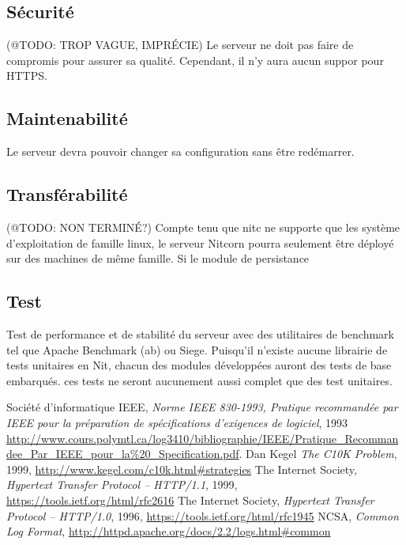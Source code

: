 \documentclass{scrreprt}
\begin{document}
\subsection{Sécurité}
(@TODO: TROP VAGUE, IMPRÉCIE)
Le serveur ne doit pas faire de compromis pour assurer sa qualité. Cependant, il n'y aura aucun suppor pour HTTPS.
\subsection{Maintenabilité}
Le serveur devra pouvoir changer sa configuration sans être redémarrer.
\subsection{Transférabilité} 
(@TODO: NON TERMINÉ?)
Compte tenu que nitc ne supporte que les système d'exploitation de famille linux, le serveur Nitcorn pourra seulement être déployé
sur des machines de même famille. Si le module de persistance 

\subsection{Test}
Test de performance et de stabilité du serveur avec des utilitaires de benchmark tel que Apache Benchmark (ab) ou Siege. Puisqu'il n'existe aucune librairie de tests unitaires en Nit, chacun des modules développées auront des tests de base embarqués. ces tests ne seront aucunement aussi complet que des test unitaires.
\begin{thebibliography}{9}
  Société d'informatique IEEE,
\emph{Norme IEEE 830-1993, Pratique recommandée par IEEE pour la préparation de
spécifications d’exigences de logiciel}, 1993
\url{http://www.cours.polymtl.ca/log3410/bibliographie/IEEE/Pratique_Recommandee_Par_IEEE_pour_la\%20_Specification.pdf}.
  Dan Kegel
\emph{The C10K Problem}, 1999, \url{http://www.kegel.com/c10k.html#strategies}
    The Internet Society,
\emph{Hypertext Transfer Protocol -- HTTP/1.1}, 1999,
\url{https://tools.ietf.org/html/rfc2616}
    The Internet Society,
\emph{Hypertext Transfer Protocol -- HTTP/1.0}, 1996,
\url{https://tools.ietf.org/html/rfc1945}
	NCSA,
\emph{Common Log Format},
\url{http://httpd.apache.org/docs/2.2/logs.html#common}	
\end{thebibliography}

\end{document}
